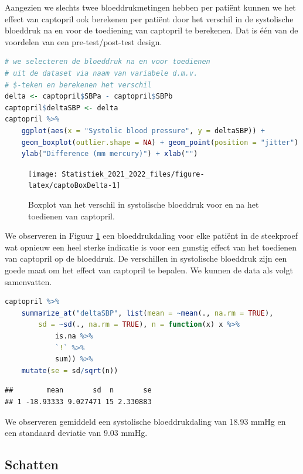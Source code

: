 \documentclass[
  12pt,dutch,coursenotes]{book}
\theoremstyle{definition}
\theoremstyle{definition}
\theoremstyle{definition}
\theoremstyle{definition}
\theoremstyle{remark}
\begin{document}
Aangezien we slechts twee bloeddrukmetingen hebben per patiënt kunnen we het effect van captopril ook berekenen per patiënt door het verschil in de systolische bloeddruk na en voor de toediening van captopril te berekenen. Dat is één van de voordelen van een pre-test/post-test design.

\begin{lstlisting}[language=R]
# we selecteren de bloeddruk na en voor toedienen
# uit de dataset via naam van variabele d.m.v.
# $-teken en berekenen het verschil
delta <- captopril$SBPa - captopril$SBPb
captopril$deltaSBP <- delta
captopril %>%
    ggplot(aes(x = "Systolic blood pressure", y = deltaSBP)) +
    geom_boxplot(outlier.shape = NA) + geom_point(position = "jitter") +
    ylab("Difference (mm mercury)") + xlab("")
\end{lstlisting}

\begin{figure}

{\centering \texttt{[image: Statistiek\_2021\_2022\_files/figure-latex/captoBoxDelta-1]} 

}

\caption{Boxplot van het verschil in systolische bloeddruk voor en na het toedienen van captopril.}\label{fig:captoBoxDelta}
\end{figure}

We observeren in Figuur \ref{fig:captoBoxDelta} een bloeddrukdaling voor elke patiënt in de steekproef wat opnieuw een heel sterke indicatie is voor een gunstig effect van het toedienen van captopril op de bloeddruk.
De verschillen in systolische bloeddruk zijn een goede maat om het effect van captopril te bepalen.
We kunnen de data als volgt samenvatten.

\begin{lstlisting}[language=R]
captopril %>%
    summarize_at("deltaSBP", list(mean = ~mean(., na.rm = TRUE),
        sd = ~sd(., na.rm = TRUE), n = function(x) x %>%
            is.na %>%
            `!` %>%
            sum)) %>%
    mutate(se = sd/sqrt(n))
\end{lstlisting}

\begin{lstlisting}
##        mean       sd  n       se
## 1 -18.93333 9.027471 15 2.330883
\end{lstlisting}

We observeren gemiddeld een systolische bloeddrukdaling van 18.93 mmHg en een standaard deviatie van 9.03 mmHg.

\hypertarget{schatten}{%
\subsection{Schatten}\label{schatten}}
\end{document}
